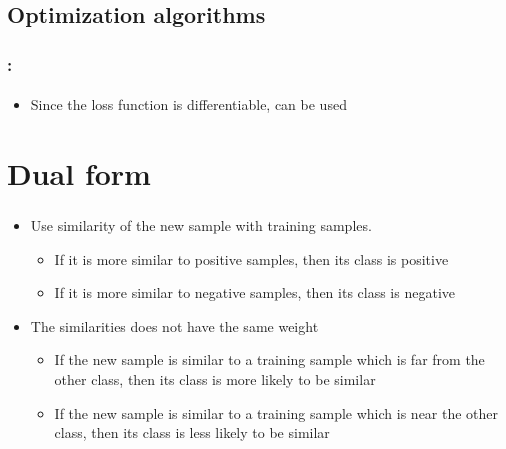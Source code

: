 \documentclass[xcolor=table]{beamer}
\begin{document}
\subsection{Optimization algorithms}

\begin{frame}
	\frametitle{\insertshortsubtitle: \insertsection}
	\framesubtitle{\insertsubsection}
	
	\begin{itemize}
		\item Since the loss function is differentiable,  can be used
	\end{itemize}
	
\end{frame}


\section{Dual form}

\begin{frame}
	\frametitle{\insertshortsubtitle}
	\framesubtitle{\insertsection}
	
	\begin{minipage}{0.70\textwidth} 
		\begin{itemize}
			\item Use similarity of the new sample with training samples. 
			\begin{itemize}
				\item If it is more similar to positive samples, then its class is positive
				\item If it is more similar to negative samples, then its class is negative
			\end{itemize}
			\item The similarities does not have the same weight
			\begin{itemize}
				\item If the new sample is similar to a training sample which is far from the other class, then its class is more likely to be similar
				\item If the new sample is similar to a training sample which is near the other class, then its class is less likely to be similar
			\end{itemize}
		\end{itemize}
	\end{minipage}
	\begin{minipage}{0.29\textwidth} 
	\end{minipage}
	
	
\end{frame}
\end{document}
